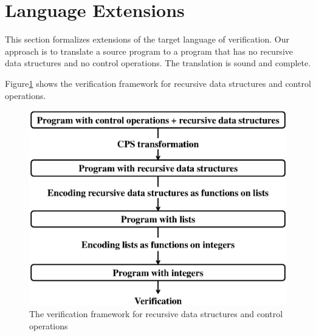 \section{Language Extensions}
\label{sec:extension}

This section formalizes extensions of the target language of
verification.  Our approach is to translate a source program to a
program that has no recursive data structures and no control operations.
The translation is sound and complete.

Figure\ref{fig:extension} shows the verification framework for recursive data structures and control
operations.

\begin{figure}
 \begin{center}
  \includegraphics[scale=0.4]{extension.eps}
 \end{center}
\caption{The verification framework for recursive data structures and control operations}
\label{fig:extension}
\end{figure}

